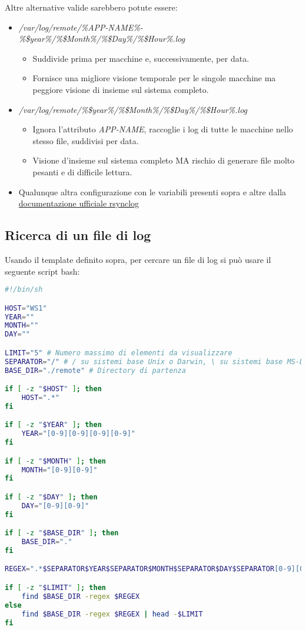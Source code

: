 \documentclass[../DocumentazioneProgetto.tex]{subfiles}
\begin{document}
Altre alternative valide sarebbero potute essere:
\begin{itemize}
	\item \textit{/var/log/remote/\%APP-NAME\%-\%\$year\%/\%\$Month\%/\%\$Day\%/\%\$Hour\%.log}
	\begin{itemize}
		\item Suddivide prima per macchine e, successivamente, per data.
		\item Fornisce una migliore visione temporale per le singole macchine ma peggiore visione di insieme sul sistema completo.
	\end{itemize}
	\item \textit{/var/log/remote/\%\$year\%/\%\$Month\%/\%\$Day\%/\%\$Hour\%.log}
	\begin{itemize}
		\item Ignora l'attributo \textit{APP-NAME}, raccoglie i log di tutte le macchine nello stesso file, suddivisi per data.
		\item Visione d'insieme sul sistema completo MA rischio di generare file molto pesanti e di difficile lettura. 
	\end{itemize}
	\item Qualunque altra configurazione con le variabili presenti sopra e altre dalla \href{https://www.rsyslog.com/doc/master/configuration/properties.html}{documentazione ufficiale rsynclog}
\end{itemize}
\subsection{Ricerca di un file di log} 
Usando il template definito sopra, per cercare un file di log si può usare il seguente script bash:
\begin{lstlisting}[language=Bash, caption=Script per ricercare log dati specifici parametri] 
#!/bin/sh

HOST="WS1"
YEAR=""
MONTH=""
DAY=""

LIMIT="5" # Numero massimo di elementi da visualizzare
SEPARATOR="/" # / su sistemi base Unix o Darwin, \ su sistemi base MS-DOS
BASE_DIR="./remote" # Directory di partenza

if [ -z "$HOST" ]; then
	HOST=".*"
fi

if [ -z "$YEAR" ]; then
	YEAR="[0-9][0-9][0-9][0-9]"
fi

if [ -z "$MONTH" ]; then
	MONTH="[0-9][0-9]"
fi

if [ -z "$DAY" ]; then
	DAY="[0-9][0-9]"
fi

if [ -z "$BASE_DIR" ]; then
	BASE_DIR="."
fi

REGEX=".*$SEPARATOR$YEAR$SEPARATOR$MONTH$SEPARATOR$DAY$SEPARATOR[0-9][0-9]-$HOST.log"

if [ -z "$LIMIT" ]; then
	find $BASE_DIR -regex $REGEX
else
	find $BASE_DIR -regex $REGEX | head -$LIMIT
fi\end{lstlisting}
\end{document}
